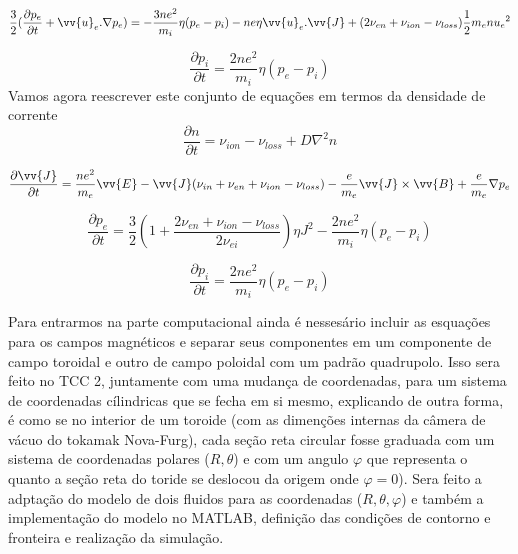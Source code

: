 \documentclass[12pt,oneside,a4paper]{abntex2}
\theoremstyle{definition}  %
\begin{document}
\begin{equation}
\frac{3}{2} (\frac{\partial p_e}{\partial t} + \vv{u}_e . \nabla p_e) = -\frac{3ne^2}{m_i} \eta(p_e-p_i)-ne\eta \vv{u}_e.\vv{J}+(2 \nu_{en} + \nu_{ion} - \nu_{loss} )\frac{1}{2}m_en{u_e}^2
\end{equation}

\begin{equation}
\frac{\partial p_i}{\partial t} = \frac{2ne^2}{m_i}\eta(p_e-p_i)
\end{equation}
Vamos agora reescrever este conjunto de equações em termos da densidade de corrente
\begin{equation}
\frac{\partial n}{\partial t} = \nu_{ion} - \nu_{loss}+D\nabla^2n
\end{equation}

\begin{equation}
\frac{\partial \vv{J}}{\partial t} =  \frac{ne^2}{m_e} \vv{E} -\vv{J}(\nu_{in}+\nu_{en}+\nu_{ion}-\nu_{loss}) -\frac{e}{m_e}\vv{J} \times \vv{B}+\frac{e}{m_e}\nabla p_e 
\end{equation}

\begin{equation}
\frac{\partial p_e}{\partial t} = \frac{3}{2}(1+\frac{2 \nu_{en} + \nu_{ion} - \nu_{loss}}{2\nu_{ei}})\eta J^2  -\frac{2ne^2}{m_i} \eta (p_e-p_i)
\end{equation}

\begin{equation}
\frac{\partial p_i}{\partial t} = \frac{2ne^2}{m_i}\eta(p_e-p_i)
\end{equation}

Para entrarmos na parte computacional ainda é nessesário incluir as esquações para os campos magnéticos e separar seus componentes em um componente de campo toroidal e outro de campo poloidal com um padrão quadrupolo. Isso sera feito no TCC 2, juntamente com uma mudança de coordenadas, para um sistema de coordenadas cílindricas que se fecha em si mesmo, explicando de outra forma, é como se no interior de um toroide (com as dimenções internas da câmera de vácuo do tokamak Nova-Furg), cada seção reta circular fosse graduada com um sistema de coordenadas polares ($R,\theta$) e com um angulo $\varphi$ que representa o quanto a seção reta do toride se deslocou da origem onde $\varphi=0$). Sera feito a adptação do modelo de dois fluidos para as coordenadas ($R,\theta,\varphi$) e também a implementação do modelo no MATLAB, definição das condições de contorno e fronteira e realização da simulação. 
\end{document}
